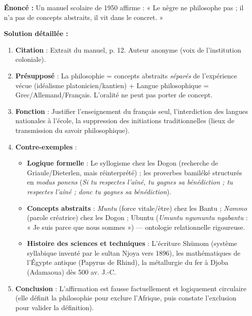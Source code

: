 \documentclass[11pt]{article}
\newcommand{\cle}[1]{{\popxbold\color{popdark}#1}}
\begin{document}
\begin{exoresolu}
\textbf{Énoncé :} Un manuel scolaire de 1950 affirme : « Le nègre ne philosophe pas ; il n'a pas de concepts abstraits, il vit dans le concret. »

\textbf{Solution détaillée :}
\begin{enumerate}
    \item \textbf{Citation} : Extrait du manuel, p. 12. Auteur anonyme (voix de l'institution coloniale).
    \item \textbf{Présupposé} : La philosophie = concepts abstraits \emph{séparés} de l'expérience vécue (idéalisme platonicien/kantien) + Langue philosophique = Grec/Allemand/Français. L'oralité ne peut pas porter de concept.
    \item \textbf{Fonction} : Justifier l'enseignement du français seul, l'interdiction des langues nationales à l'école, la suppression des initiations traditionnelles (lieux de transmission du savoir philosophique).
    \item \textbf{Contre-exemples} :
        \begin{itemize}
            \item \textbf{Logique formelle} : Le syllogisme chez les Dogon (recherche de Griaule/Dieterlen, mais réinterprété) ; les proverbes bamiléké structurés en \emph{modus ponens} (\emph{Si tu respectes l'aîné, tu gagnes sa bénédiction ; tu respectes l'aîné ; donc tu gagnes sa bénédiction}).
            \item \textbf{Concepts abstraits} : \emph{Muntu} (force vitale/être) chez les Bantu ; \emph{Nommo} (parole créatrice) chez les Dogon ; \cle{Ubuntu} (\emph{Umuntu ngumuntu ngabantu} : « Je suis parce que nous sommes ») — ontologie relationnelle rigoureuse.
            \item \textbf{Histoire des sciences et techniques} : L'écriture Shümom (système syllabique inventé par le sultan Njoya vers 1896), les mathématiques de l'Égypte antique (Papyrus de Rhind), la métallurgie du fer à Djoba (Adamaoua) dès 500 av. J.-C.
        \end{itemize}
    \item \textbf{Conclusion} : L'affirmation est fausse factuellement et logiquement circulaire (elle définit la philosophie pour exclure l'Afrique, puis constate l'exclusion pour valider la définition).
\end{enumerate}
\end{exoresolu}
\end{document}
